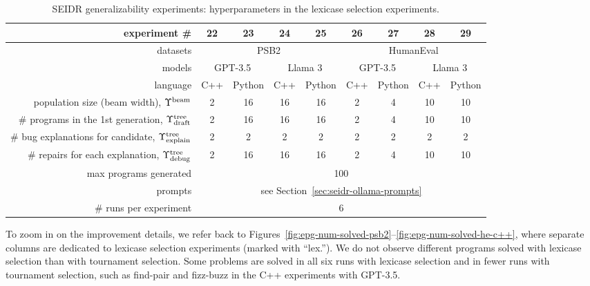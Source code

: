 \begin{table}[t]
\setlength{\tabcolsep}{4pt}
\centering
\caption{SEIDR generalizability experiments: hyperparameters in the lexicase selection experiments.}\small
\label{tab:lexicase-selection-hyperparameters}
\begin{tabular}{rcccc|cccc}
\toprule
experiment \# & 22 & 23 & 24 & 25 & 26 & 27 & 28 & 29 \\
\midrule
datasets  & \multicolumn{4}{c|}{PSB2} & \multicolumn{4}{c}{HumanEval}  \\ 
\midrule
models  & 
\multicolumn{2}{c|}{GPT-3.5} &
\multicolumn{2}{c|}{Llama 3} &
\multicolumn{2}{c|}{GPT-3.5} &
\multicolumn{2}{c}{Llama 3}\\ 
\midrule
language  & C++ & Python & C++ & \multicolumn{1}{c|}{Python} & C++ & Python & C++ & Python \\
\midrule
population size (beam width), $\Upsilon^\text{beam}{}$ & 2 & 16 & 16 & 16 & 2 & 4 & 10 & 10  \\
\# programs in the 1st generation, $\Upsilon^\text{tree}_\text{draft}$ & 2 & 16 & 16 & 16 & 2 & 4 & 10 & 10  \\
\# bug explanations for candidate, $\Upsilon^\text{tree}_\text{explain}$ & 2 & 2 & 2 & 2 & 2 & 2 & 2 & 2 \\
\# repairs for each explanation, $\Upsilon^\text{tree}_\text{debug}$ & 2 & 16 & 16 & 16 & 2 & 4 & 10 & 10 \\
\midrule
max programs generated & \multicolumn{8}{c}{100} \\
prompts & \multicolumn{8}{c}{see Section~\ref{sec:seidr-ollama-prompts}} \\
\# runs per experiment &  \multicolumn{8}{c}{6} \\
\bottomrule
\end{tabular}
\end{table}



To zoom in on the improvement details, we refer back to Figures~\ref{fig:epg-num-solved-psb2}--\ref{fig:epg-num-solved-he-c++}, where separate columns are dedicated to lexicase selection experiments (marked with ``lex.'').
We do not observe different programs solved with lexicase selection than with tournament selection. 
Some problems are solved in all six runs with lexicase selection and in fewer runs with tournament selection, such as find-pair and fizz-buzz in the C++ experiments with GPT-3.5.

